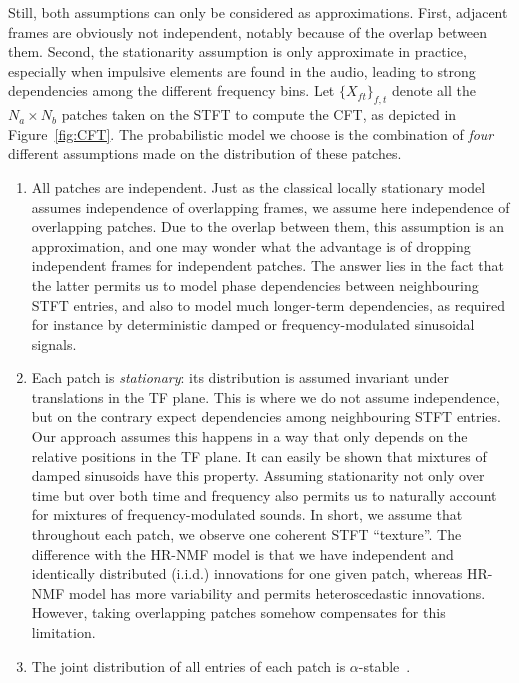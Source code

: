 Still, both assumptions can only be considered as approximations.
First, adjacent frames are obviously not independent, notably because
of the overlap between them. Second, the stationarity assumption is
only approximate in practice, especially when impulsive elements are
found in the audio, leading to strong dependencies among the different
frequency bins. Let $\{ X_{ft}\} _{f,t}$
denote all the $N_{a}\times N_{b}$ patches taken on the STFT to compute
the CFT, as depicted in Figure~\ref{fig:CFT}. The probabilistic
model we choose is the combination of \emph{four} different assumptions
made on the distribution of these patches.

\begin{enumerate}[leftmargin=0cm,itemindent=.5cm,labelwidth=\itemindent,labelsep=0cm,align=left]
\item All patches are independent. Just as the classical locally stationary
model~\cite{GP-USS-TSP} assumes independence of overlapping frames,
we assume here independence of overlapping patches. Due to the
overlap between them, this assumption is an approximation,
and one may wonder what the advantage is of dropping independent frames
for independent patches. The answer lies in the fact that the latter
permits us to model phase dependencies between neighbouring STFT entries,
and also to model much longer-term dependencies, as required for instance
by deterministic damped or frequency-modulated sinusoidal signals.\label{enu:assumption_independent_patches}
\item Each patch is \emph{stationary}: its distribution
is assumed invariant under translations in the TF plane. This is where we do not assume independence, but on the contrary expect dependencies among neighbouring STFT entries. Our approach assumes this happens in a way that only depends on the relative positions in
the TF plane. It can easily be shown that mixtures of
damped sinusoids have this property. Assuming stationarity not only over time but over both time and frequency
also permits us to naturally account for mixtures of frequency-modulated
sounds. In short, we assume that throughout each patch, we observe
one coherent STFT ``texture''. The difference with the HR-NMF model is that we have independent and identically
distributed (i.i.d.) innovations for one given patch, whereas HR-NMF model has more variability and permits heteroscedastic innovations. However, taking overlapping patches somehow compensates for
this limitation.\label{enu:assumption_stationary}
\item The joint distribution of all entries of each patch is $\alpha$-stable~\cite{samoradnitsky1994stable}.

\end{enumerate}
